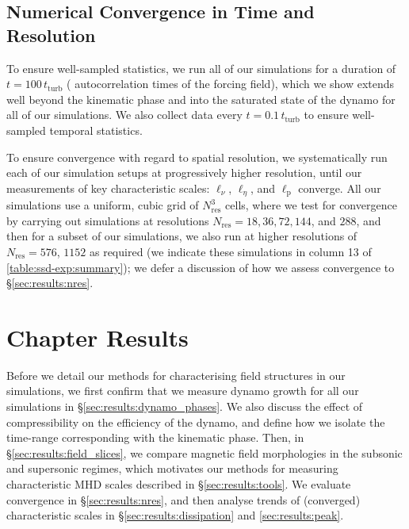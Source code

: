 \subsection{Numerical Convergence in Time and Resolution}
\label{sec:ICs:nres}

To ensure well-sampled statistics, we run all of our simulations for a duration of $t = 100 \,t_\mathrm{turb}$ ( autocorrelation times of the forcing field), which we show extends well beyond the kinematic phase and into the saturated state of the dynamo for all of our simulations. We also collect data every $t = 0.1 \,t_\mathrm{turb}$ to ensure well-sampled temporal statistics.

To ensure convergence with regard to spatial resolution, we systematically run each of our simulation setups at progressively higher resolution, until our measurements of key characteristic scales: $\ell_\nu$, $\ell_\eta$, and $\ell_\mathrm{p}$ converge. All our simulations use a uniform, cubic grid of $N_\mathrm{res}^3$ cells, where we test for convergence by carrying out simulations at resolutions $N_\mathrm{res} = 18, 36, 72, 144$, and $288$, and then for a subset of our simulations, we also run at higher resolutions of $N_\mathrm{res} = 576$, $1152$ as required (we indicate these simulations in column 13 of \autoref{table:ssd-exp:summary}); we defer a discussion of how we assess convergence to \S\ref{sec:results:nres}.



\section{Chapter Results}
\label{sec:results}

Before we detail our methods for characterising field structures in our simulations, we first confirm that we measure dynamo growth for all our simulations in \S\ref{sec:results:dynamo_phases}. We also discuss the effect of compressibility on the efficiency of the dynamo, and define how we isolate the time-range corresponding with the kinematic phase. Then, in \S\ref{sec:results:field_slices}, we compare magnetic field morphologies in the subsonic and supersonic regimes, which motivates our methods for measuring characteristic MHD scales described in \S\ref{sec:results:tools}. We evaluate convergence in \S\ref{sec:results:nres}, and then analyse trends of (converged) characteristic scales in \S\ref{sec:results:dissipation} and \ref{sec:results:peak}.

